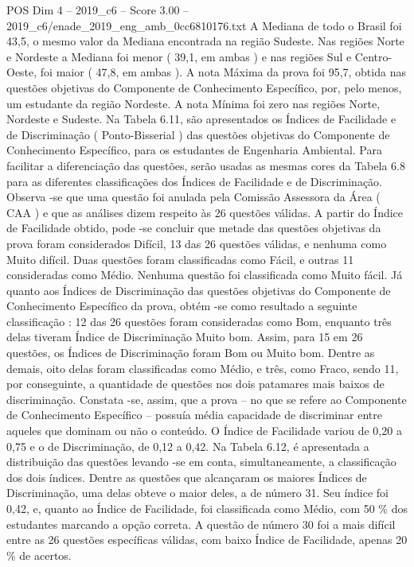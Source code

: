 \begin{textsample}{POS Dim 4 – 2019\_c6 – Score 3.00 – 2019\_c6/enade\_2019\_eng\_amb\_0cc6810176.txt}
A Mediana de todo o Brasil foi 43,5, o mesmo valor da Mediana encontrada na região Sudeste.
Nas regiões Norte e Nordeste a Mediana foi menor ( 39,1, em ambas ) e nas regiões Sul e Centro-Oeste, foi maior ( 47,8, em ambas ).
A nota Máxima da prova foi 95,7, obtida nas questões objetivas do Componente de Conhecimento Específico, por, pelo menos, um estudante da região Nordeste.
A nota Mínima foi zero nas regiões Norte, Nordeste e Sudeste.
Na Tabela 6.11, são apresentados os Índices de Facilidade e de Discriminação ( Ponto-Bisserial ) das questões objetivas do Componente de Conhecimento Específico, para os estudantes de Engenharia Ambiental.
Para facilitar a diferenciação das questões, serão usadas as mesmas cores da Tabela 6.8 para as diferentes classificações dos Índices de Facilidade e de Discriminação.
Observa -se que uma questão foi anulada pela Comissão Assessora da Área ( CAA ) e que as análises dizem respeito às 26 questões válidas.
A partir do Índice de Facilidade obtido, pode -se concluir que metade das questões objetivas da prova foram considerados Difícil, 13 das 26 questões válidas, e nenhuma como Muito difícil.
Duas questões foram classificadas como Fácil, e outras 11 consideradas como Médio.
Nenhuma questão foi classificada como Muito fácil.
Já quanto aos Índices de Discriminação das questões objetivas do Componente de Conhecimento Específico da prova, obtém -se como resultado a seguinte classificação : 12 das 26 questões foram consideradas como Bom, enquanto três delas tiveram Índice de Discriminação Muito bom.
Assim, para 15 em 26 questões, os Índices de Discriminação foram Bom ou Muito bom.
Dentre as demais, oito delas foram classificadas como Médio, e três, como Fraco, sendo 11, por conseguinte, a quantidade de questões nos dois patamares mais baixos de discriminação.
Constata -se, assim, que a prova – no que se refere ao Componente de Conhecimento Específico – possuía média capacidade de discriminar entre aqueles que dominam ou não o conteúdo.
O Índice de Facilidade variou de 0,20 a 0,75 e o de Discriminação, de 0,12 a 0,42.
Na Tabela 6.12, é apresentada a distribuição das questões levando -se em conta, simultaneamente, a classificação dos dois índices.
Dentre as questões que alcançaram os maiores Índices de Discriminação, uma delas obteve o maior deles, a de número 31.
Seu índice foi 0,42, e, quanto ao Índice de Facilidade, foi classificada como Médio, com 50 \% dos estudantes marcando a opção correta.
A questão de número 30 foi a mais difícil entre as 26 questões específicas válidas, com baixo Índice de Facilidade, apenas 20 \% de acertos.

\end{textsample}
